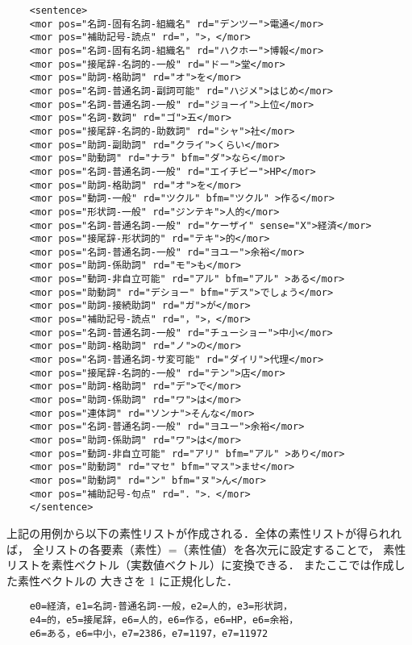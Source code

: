\documentclass[japanese]{jnlp_1.4}
\begin{document}
\small
\begin{verbatim}
    <sentence>
    <mor pos="名詞-固有名詞-組織名" rd="デンツー">電通</mor>
    <mor pos="補助記号-読点" rd="，">，</mor>
    <mor pos="名詞-固有名詞-組織名" rd="ハクホー">博報</mor>
    <mor pos="接尾辞-名詞的-一般" rd="ドー">堂</mor>
    <mor pos="助詞-格助詞" rd="オ">を</mor>
    <mor pos="名詞-普通名詞-副詞可能" rd="ハジメ">はじめ</mor>
    <mor pos="名詞-普通名詞-一般" rd="ジョーイ">上位</mor>
    <mor pos="名詞-数詞" rd="ゴ">五</mor>
    <mor pos="接尾辞-名詞的-助数詞" rd="シャ">社</mor>
    <mor pos="助詞-副助詞" rd="クライ">くらい</mor>
    <mor pos="助動詞" rd="ナラ" bfm="ダ">なら</mor>
    <mor pos="名詞-普通名詞-一般" rd="エイチピー">HP</mor>
    <mor pos="助詞-格助詞" rd="オ">を</mor>
    <mor pos="動詞-一般" rd="ツクル" bfm="ツクル" >作る</mor>
    <mor pos="形状詞-一般" rd="ジンテキ">人的</mor>
    <mor pos="名詞-普通名詞-一般" rd="ケーザイ" sense="X">経済</mor>
    <mor pos="接尾辞-形状詞的" rd="テキ">的</mor>
    <mor pos="名詞-普通名詞-一般" rd="ヨユー">余裕</mor>
    <mor pos="助詞-係助詞" rd="モ">も</mor>
    <mor pos="動詞-非自立可能" rd="アル" bfm="アル" >ある</mor>
    <mor pos="助動詞" rd="デショー" bfm="デス">でしょう</mor>
    <mor pos="助詞-接続助詞" rd="ガ">が</mor>
    <mor pos="補助記号-読点" rd="，">，</mor>
    <mor pos="名詞-普通名詞-一般" rd="チューショー">中小</mor>
    <mor pos="助詞-格助詞" rd="ノ">の</mor>
    <mor pos="名詞-普通名詞-サ変可能" rd="ダイリ">代理</mor>
    <mor pos="接尾辞-名詞的-一般" rd="テン">店</mor>
    <mor pos="助詞-格助詞" rd="デ">で</mor>
    <mor pos="助詞-係助詞" rd="ワ">は</mor>
    <mor pos="連体詞" rd="ソンナ">そんな</mor>
    <mor pos="名詞-普通名詞-一般" rd="ヨユー">余裕</mor>
    <mor pos="助詞-係助詞" rd="ワ">は</mor>
    <mor pos="動詞-非自立可能" rd="アリ" bfm="アル" >あり</mor>
    <mor pos="助動詞" rd="マセ" bfm="マス">ませ</mor>
    <mor pos="助動詞" rd="ン" bfm="ヌ">ん</mor>
    <mor pos="補助記号-句点" rd="．">．</mor>
    </sentence>
\end{verbatim}

\normalsize
上記の用例から以下の素性リストが作成される．全体の素性リストが得られれば，
全リストの各要素（素性）=（素性値）を各次元に設定することで，
素性リストを素性ベクトル（実数値ベクトル）に変換できる．
またここでは作成した素性ベクトルの
大きさを 1 に正規化した．

\begin{verbatim}
    e0=経済，e1=名詞-普通名詞-一般，e2=人的，e3=形状詞，
    e4=的，e5=接尾辞，e6=人的，e6=作る，e6=HP，e6=余裕，
    e6=ある，e6=中小，e7=2386，e7=1197，e7=11972

\end{verbatim}
\end{document}
